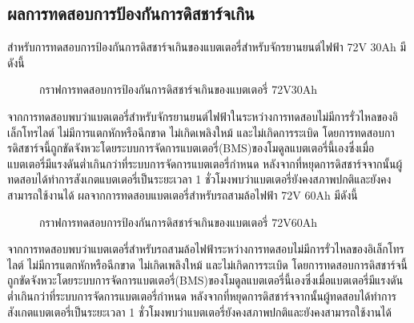 \subsection{ผลการทดสอบการป้องกันการดิสชาร์จเกิน}
สำหรับการทดสอบการป้องกันการดิสชาร์จเกินของแบตเตอรี่สำหรับจักรยานยนต์ไฟฟ้า 72V 30Ah มีดังนี้
\begin{center}
	\begin{figure}[H]
		\centering
		\captionsetup{justification=centering,margin=2cm}
		\caption{กราฟการทดสอบการป้องกันการดิสชาร์จเกินของแบตเตอรี่ 72V30Ah}
	\end{figure}
\end{center}
จากการทดสอบพบว่าแบตเตอรี่สำหรับจักรยานยนต์ไฟฟ้าในระหว่างการทดสอบไม่มีการรั่วไหลของอิเล็กโทรไลต์ ไม่มีการแตกหักหรือฉีกขาด ไม่เกิดเพลิงใหม้ และไม่เกิดการระเบิด
โดยการทดสอบการดิสชาร์จนี้ถูกขัดจังหวะโดยระบบการจัดการแบตเตอรี่(BMS)ของโมดูลแบตเตอรี่นี้เองซึ่งเมื่อแบตเตอรี่มีแรงดันต่ำเกินกว่าที่ระบบการจัดการแบตเตอรี่กำหนด
หลังจากที่หยุดการดิสชาร์จจากนั้นผู้ทดสอบได้ทำการสังเกตแบตเตอรี่เป็นระยะเวลา 1 ชั่วโมงพบว่าแบตเตอรี่ยังคงสภาพปกติและยังคงสามารถใช้งานได้
\newline
ผลจากการทดสอบแบตเตอรี่สำหรับรถสามล้อไฟฟ้า 72V 60Ah มีดังนี้
\begin{center}
	\begin{figure}[H]
		\centering
		\captionsetup{justification=centering,margin=2cm}
		\caption{กราฟการทดสอบการป้องกันการดิสชาร์จเกินของแบตเตอรี่ 72V60Ah}
	\end{figure}
\end{center}
\hspace*{2cm}
จากการทดสอบพบว่าแบตเตอรี่สำหรับรถสามล้อไฟฟ้าระหว่างการทดสอบไม่มีการรั่วไหลของอิเล็กโทรไลต์ ไม่มีการแตกหักหรือฉีกขาด ไม่เกิดเพลิงใหม้ และไม่เกิดการระเบิด
โดยการทดสอบการดิสชาร์จนี้ถูกขัดจังหวะโดยระบบการจัดการแบตเตอรี่(BMS)ของโมดูลแบตเตอรี่นี้เองซึ่งเมื่อแบตเตอรี่มีแรงดันต่ำเกินกว่าที่ระบบการจัดการแบตเตอรี่กำหนด
หลังจากที่หยุดการดิสชาร์จจากนั้นผู้ทดสอบได้ทำการสังเกตแบตเตอรี่เป็นระยะเวลา 1 ชั่วโมงพบว่าแบตเตอรี่ยังคงสภาพปกติและยังคงสามารถใช้งานได้
